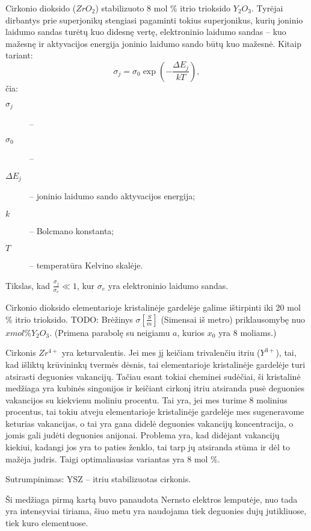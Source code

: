 
Cirkonio dioksido ($ZrO_{2}$) stabilizuoto 8 mol \% itrio trioksido
$Y_{2}O_{3}$. Tyrėjai dirbantys prie superjonikų stengiasi pagaminti
tokius superjonikus, kurių joninio laidumo sandas turėtų kuo didesnę
vertę, elektroninio laidumo sandas – kuo mažesnę ir aktyvacijos
energija joninio laidumo sando būtų kuo mažesnė. Kitaip tariant:
\begin{equation*}
  \sigma_{j} = \sigma_{0} \exp\left( - \frac{\Delta E_{j}}{kT} \right),
\end{equation*}
čia:
\begin{description}
  \item[$\sigma_{j}$] –
  \item[$\sigma_{0}$] –
  \item[$\Delta E_{j}$] – joninio laidumo sando aktyvacijos energija;
  \item[$k$] – Bolcmano konstanta;
  \item[$T$] – temperatūra Kelvino skalėje.
\end{description}
Tikslas, kad $\frac{\sigma_{j}}{\sigma_{e}} \ll 1$, kur $\sigma_{e}$
yra elektroninio laidumo sandas.

Cirkonio dioksido elementarioje kristalinėje gardelėje galime ištirpinti
iki 20 mol \% itrio trioksido.
TODO: Brėžinys $\sigma [\frac{S}{m}]$ (Simensai iš metro) priklausomybę
nuo $x mol \% Y_{2}O_{3}$. (Primena parabolę su neigiamu $a$, kurios
$x_{0}$ yra $8$ moliams.)

Cirkonis $Zr^{4+}$ yra keturvalentis. Jei mes jį keičiam trivalenčiu
itriu ($Y^{3+}$), tai, kad išliktų krūvininkų tvermės dėsnis, tai
elementarioje kristalinėje gardelėje turi atsirasti deguonies vakancijų.
Tačiau esant tokiai cheminei sudėčiai, ši kristalinė medžiaga
yra kubinės singonijos ir keičiant cirkonį itriu atsiranda pusė
deguonies vakancijos su kiekvienu moliniu procentu. Tai yra, jei
mes turime 8 molinius procentus, tai tokiu atveju elementarioje
kristalinėje gardelėje mes sugeneravome keturias vakancijas, o
tai yra gana didelė deguonies vakancijų koncentracija, o jomis
gali judėti deguonies anijonai. Problema yra, kad didėjant vakancijų
kiekiui, kadangi jos yra to paties ženklo, tai tarp jų atsiranda
stūma ir dėl to mažėja judris. Taigi optimaliausias variantas 
yra 8 mol \%.

Sutrumpinimas: YSZ – itriu stabilizuotas cirkonis.

Ši medžiaga pirmą kartą buvo panaudota Nernsto elektros lemputėje,
nuo tada yra intensyviai tiriama, šiuo metu yra naudojama tiek
deguonies dujų jutikliuose, tiek kuro elementuose.

